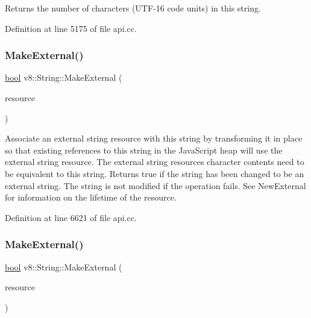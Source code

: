 Returns the number of characters (U\+T\+F-\/16 code units) in this string. 

Definition at line 5175 of file api.\+cc.

\mbox{\label{classv8_1_1String_a5efd1eba40c1fa8a6aae2c4a175a63be}} 
\subsubsection{\texorpdfstring{Make\+External()}{MakeExternal()}\hspace{0.1cm}{\footnotesize\ttfamily [1/2]}}
{\footnotesize\ttfamily \mbox{\hyperlink{classbool}{bool}} v8\+::\+String\+::\+Make\+External (\begin{DoxyParamCaption}\item[{\mbox{\hyperlink{classv8_1_1String_1_1ExternalStringResource}{External\+String\+Resource}} $\ast$}]{resource }\end{DoxyParamCaption})}

Associate an external string resource with this string by transforming it in place so that existing references to this string in the Java\+Script heap will use the external string resource. The external string resource\textquotesingle{}s character contents need to be equivalent to this string. Returns true if the string has been changed to be an external string. The string is not modified if the operation fails. See New\+External for information on the lifetime of the resource. 

Definition at line 6621 of file api.\+cc.

\mbox{\label{classv8_1_1String_a607d632c720eec5133649f522aefa944}} 
\subsubsection{\texorpdfstring{Make\+External()}{MakeExternal()}\hspace{0.1cm}{\footnotesize\ttfamily [2/2]}}
{\footnotesize\ttfamily \mbox{\hyperlink{classbool}{bool}} v8\+::\+String\+::\+Make\+External (\begin{DoxyParamCaption}\item[{\mbox{\hyperlink{classv8_1_1String_1_1ExternalOneByteStringResource}{External\+One\+Byte\+String\+Resource}} $\ast$}]{resource }\end{DoxyParamCaption})}

